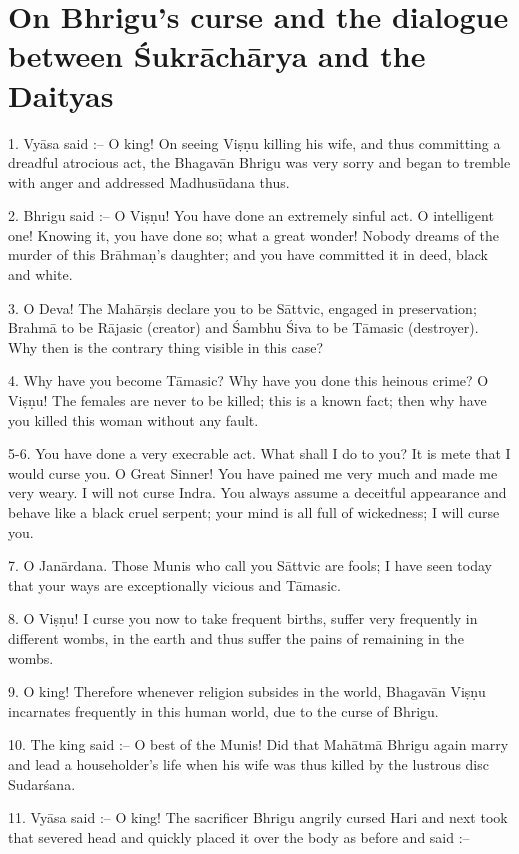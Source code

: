 \chapter{On Bhrigu's curse and the dialogue between \'Sukr\=ach\=arya and the Daityas}

1. Vy\=asa said :-- O king! On seeing Vi\d{s}\d{n}u killing his wife, and thus committing a dreadful atrocious act, the Bhagav\=an Bhrigu was very sorry and began to tremble with anger and addressed Madhus\=udana thus.

2. Bhrigu said :-- O Vi\d{s}\d{n}u! You have done an extremely sinful act. O intelligent one! Knowing it, you have done so; what a great wonder! Nobody dreams of the murder of this Br\=ahma\d{n}'s daughter; and you have committed it in deed, black and white.

3. O Deva! The Mah\=ar\d{s}is declare you to be S\=attvic, engaged in preservation; Brahm\=a to be R\=ajasic (creator) and \'Sambhu \'Siva to be T\=amasic (destroyer). Why then is the contrary thing visible in this case?

4. Why have you become T\=amasic? Why have you done this heinous crime? O Vi\d{s}\d{n}u! The females are never to be killed; this is a known fact; then why have you killed this woman without any fault.

5-6. You have done a very execrable act. What shall I do to you? It is mete that I would curse you. O Great Sinner! You have pained me very much and made me very weary. I will not curse Indra. You always assume a deceitful appearance and behave like a black cruel serpent; your mind is all full of wickedness; I will curse you.

7. O Jan\=ardana. Those Munis who call you S\=attvic are fools; I have seen today that your ways are exceptionally vicious and T\=amasic.

8. O Vi\d{s}\d{n}u! I curse you now to take frequent births, suffer very frequently in different wombs, in the earth and thus suffer the pains of remaining in the wombs.

9. O king! Therefore whenever religion subsides in the world, Bhagav\=an Vi\d{s}\d{n}u incarnates frequently in this human world, due to the curse of Bhrigu.

10. The king said :-- O best of the Munis! Did that Mah\=atm\=a Bhrigu again marry and lead a householder's life when his wife was thus killed by the lustrous disc Sudar\'sana.

11. Vy\=asa said :-- O king! The sacrificer Bhrigu angrily cursed Hari and next took that severed head and quickly placed it over the body as before and said :--

